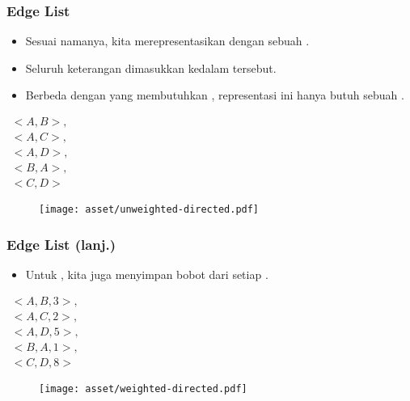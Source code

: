 \begin{frame}
\frametitle{Edge List}
\begin{itemize}
  \item Sesuai namanya, kita merepresentasikan \fgraph dengan sebuah \flist.
  \item Seluruh keterangan \fedge dimasukkan kedalam \flist tersebut.
  \item Berbeda dengan \fadjacencylist yang membutuhkan , representasi ini hanya butuh sebuah \flist.
\end{itemize}
\begin{center}
\begin{multicols}{2}
  $\begin{array}{l}
    <A, B>, \\
    <A, C>, \\
    <A, D>, \\
    <B, A>, \\
    <C, D> 
  \end{array}$
  \break
  \begin{figure}
    \texttt{[image: asset/unweighted-directed.pdf]}
  \end{figure}
\end{multicols} 
\end{center}
\end{frame}

\begin{frame}
\frametitle{Edge List (lanj.)}
\begin{itemize}
  \item Untuk  \fgraph, kita juga menyimpan bobot dari setiap \fedge.
\end{itemize}
\begin{center}
\begin{multicols}{2}
  $\begin{array}{l}
    <A, B, 3>, \\
    <A, C, 2>, \\
    <A, D, 5>, \\
    <B, A, 1>, \\
    <C, D, 8> 
  \end{array}$
  \break
  \begin{figure}
    \texttt{[image: asset/weighted-directed.pdf]}
  \end{figure}
\end{multicols} 
\end{center}
\end{frame}

